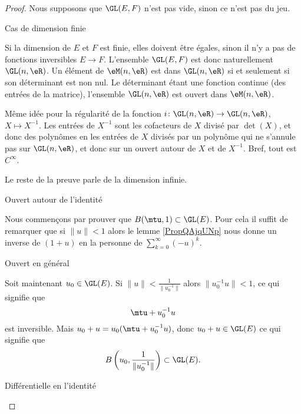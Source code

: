 \begin{proof}
Nous supposons que \( \GL(E,F)\) n'est pas vide, sinon ce n'est pas du jeu.
        \begin{subproof}

        \item[Cas de dimension finie]

            Si la dimension de \( E\) et \( F\) est finie, elles doivent être égales, sinon il n'y a pas de fonctions inversibles \( E\to F\). L'ensemble \( \GL(E,F)\) est donc naturellement \( \GL(n,\eR)\). Un élément de \( \eM(n,\eR)\) est dans \( \GL(n,\eR)\) si et seulement si son déterminant est non nul. Le déterminant étant une fonction continue (des entrées de la matrice), l'ensemble \( \GL(n,\eR)\) est ouvert dans \( \eM(n,\eR)\).

            Même idée pour la régularité de la fonction \( i\colon \GL(n,\eR)\to \GL(n,\eR)\), \( X\mapsto X^{-1}\). Les entrées de \( X^{-1}\) sont les cofacteurs de \( X\) divisé par \( \det(X)\), et donc des polynômes en les entrées de \( X\) divisés par un polynôme qui ne s'annule pas sur \( \GL(n,\eR)\), et donc sur un ouvert autour de \( X\) et de \( X^{-1}\). Bref, tout est \(  C^{\infty}\).

            Le reste de la preuve parle de la dimension infinie.

        \item[Ouvert autour de l'identité]
            
        Nous commençons par prouver que \( B(\mtu,1)\subset \GL(E)\). Pour cela il suffit de remarquer que si \( \| u \|<1\) alors le lemme \ref{PropQAjqUNp} nous donne un inverse de \( (1+u)\) en la personne de \( \sum_{k=0}^{\infty}(-u)^k\).

    \item[Ouvert en général]

        Soit maintenant \( u_0\in\GL(E)\). Si \( \| u \|<\frac{1}{ \| u_0^{-1} \| }\) alors \( \| u_0^{-1}u \|<1\), ce qui signifie que
        \begin{equation}
            \mtu+u_0^{-1}u
        \end{equation}
    est inversible. Mais \( u_0+u=u_0(\mtu+u_0^{-1}u)\), donc \( u_0+u\in\GL(E)\) ce qui signifie que
    \begin{equation}
    B\left( u_0,\frac{1}{ \| u_0^{-1} \| } \right)\subset \GL(E).
    \end{equation}

    \item[Différentielle en l'identité]


\end{subproof}
\end{proof}
